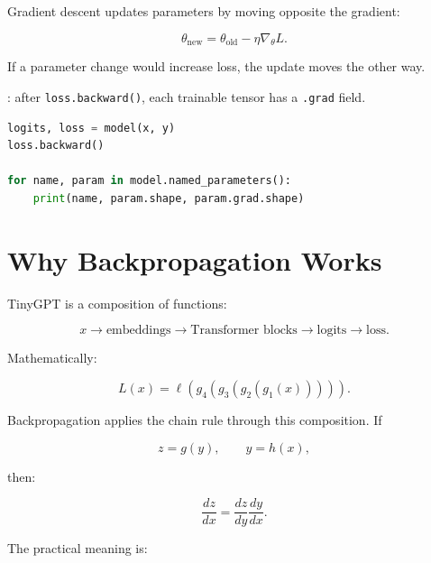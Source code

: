 Gradient descent updates parameters by moving opposite the gradient:

\[
\theta_{\text{new}} =
\theta_{\text{old}} - \eta \nabla_\theta L.
\]

If a parameter change would increase loss, the update moves the other way.

\begin{center}
\end{center}

: after \texttt{loss.backward()}, each trainable tensor has a \texttt{.grad} field.

\begin{lstlisting}[language=Python]
logits, loss = model(x, y)
loss.backward()

for name, param in model.named_parameters():
    print(name, param.shape, param.grad.shape)
\end{lstlisting}

\section{Why Backpropagation Works}

TinyGPT is a composition of functions:

\[
x
\rightarrow
\text{embeddings}
\rightarrow
\text{Transformer blocks}
\rightarrow
\text{logits}
\rightarrow
\text{loss}.
\]

Mathematically:

\[
L(x) = \ell(g_4(g_3(g_2(g_1(x))))).
\]

Backpropagation applies the chain rule through this composition. If

\[
z=g(y),\qquad y=h(x),
\]

then:

\[
\frac{dz}{dx} =
\frac{dz}{dy}
\frac{dy}{dx}.
\]

The practical meaning is:

